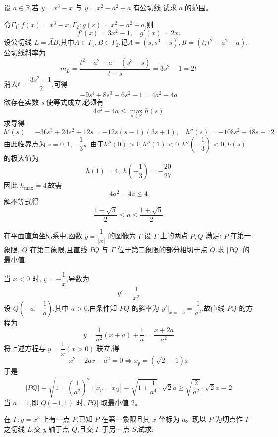 \begin{questions}
    \question 设 $a\in\mathbb{R}$,若 $y=x^3-x$ 与 $y=x^2-a^2+a$ 有公切线,试求 $a$ 的范围。
    \begin{solution}
        令$\Gamma_1:f(x)=x^3-x, \Gamma_2:g(x)=x^2-a^2+a$,则
        \[
        f'(x)=3x^2-1,\quad g'(x)=2x.
        \]
        设公切线 $L=\overleftrightarrow{AB}$,其中$A\in\Gamma_1, B\in\Gamma_2$,记$A=(s,s^3-s), B=(t,t^2-a^2+a)$,公切线斜率为
        \[
        m_L=\frac{t^2-a^2+a-(s^3-s)}{t-s}=3s^2-1=2t
        \]
        消去$t=\dfrac{3s^2-1}{2}$,可得
        \[
        -9s^4+8s^3+6s^2-1=4a^2-4a
        \]
        欲存在实数 $s$ 使等式成立,必须有
        \[
        4a^2-4a \le \max_{s\in\mathbb{R}} h(s)
        \]
        求导得
        \[
        h'(s)=-36s^3+24s^2+12s=-12s(s-1)(3s+1),\quad h''(s)=-108s^2+48s+12
        \]
        由此临界点为 $s=0,1,-\dfrac{1}{3}$。由于$h''(0)> 0, h''(1)< 0, h''\left(-\dfrac{1}{3}\right)< 0,h(s)$的极大值为
        \[
        h(1)=4,\; h\left(-\frac{1}{3}\right)=-\frac{20}{27}
        \]
        因此 $h_{\max}=4$,故需
        \[
        4a^2-4a \le 4
        \]
        解不等式得
        \[
        \frac{1-\sqrt{5}}{2}\le a\le\frac{1+\sqrt{5}}{2}
        \]
    \end{solution}

    \question 在平面直角坐标系中,函数 $y=\dfrac{1}{|x|}$ 的图像为 $\Gamma$.设 $\Gamma$ 上的两点 $P,Q$ 满足: $P$ 在第一象限, $Q$ 在第二象限,且直线 $PQ$ 与 $\Gamma$ 位于第二象限的部分相切于点 $Q$.求 $|PQ|$ 的最小值.
    \begin{solution}
        当 $x<0$ 时, $y=-\dfrac{1}{x}$,导数为 
        \[
        y'=\frac{1}{x^{2}}
        \]
        设 $Q\left(-a,-\dfrac{1}{a}\right)$,其中 $a>0$,由条件知 $PQ$ 的斜率为 $y'|_{x=-a}=\dfrac{1}{a^{2}}$,故直线 $PQ$ 的方程为 
        \[
        y=\frac{1}{a^{2}}(x+a)+\frac{1}{a}=\frac{x+2a}{a^{2}}
        \]
        将上述方程与 $y=\dfrac{1}{x}(x>0)$ 联立,得 
        \[
        x^{2}+2ax-a^{2}=0\Rightarrow x_{p}=(\sqrt{2}-1)a
        \]
        于是
        \[
        |PQ|=\sqrt{1+\left(\frac{1}{a^{2}}\right)^{2}}\cdot|x_{p}-x_{Q}|=\sqrt{1+\frac{1}{a^{4}}}\cdot\sqrt{2}a
        \ge\sqrt{\frac{2}{a^2}}\cdot\sqrt{2}a=2
        \]
        当 $a=1$,即 $Q(-1,1)$ 时,$|PQ|$ 取最小值 $2$。
    \end{solution}

    \question 在 $\Gamma: y = x^3$ 上有一点 $P$,已知 $P$ 在第一象限且其 $x$ 坐标为 $a$。现以 $P$ 为切点作 $\Gamma$ 之切线 $L$,交 $y$ 轴于点 $Q$,且交 $\Gamma$ 于另一点 $S$,试求:
    \begin{parts}

\end{parts}
\end{questions}
